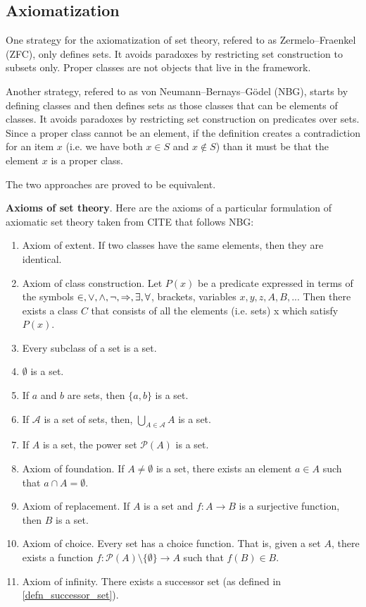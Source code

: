 \documentclass{article}
\begin{document}
\subsection{Axiomatization}

One strategy for the axiomatization of set theory, refered to as Zermelo–Fraenkel (ZFC), only defines sets. It avoids paradoxes by restricting set construction to subsets only. Proper classes are not objects that live in the framework.

Another strategy, refered to as von Neumann–Bernays–Gödel (NBG), starts by defining classes and then defines sets as those classes that can be elements of classes. It avoids paradoxes by restricting set construction on predicates over sets. Since a proper class cannot be an element, if the definition creates a contradiction for an item $x$ (i.e. we have both $x \in S$ and $x \notin S$) than it must be that the element $x$ is a proper class.

The two approaches are proved to be equivalent.

\textbf{Axioms of set theory}. Here are the axioms of a particular formulation of axiomatic set theory taken from CITE that follows NBG:
\begin{enumerate}
	\item Axiom of extent. If two classes have the same elements, then they are identical.
	\item Axiom of class construction. Let $P(x)$ be a predicate expressed in terms of the symbols $\in, \vee, \wedge, \neg, \Rightarrow, \exists, \forall$, brackets, variables $x, y, z, A, B, ...$ Then there exists a class $C$ that consists of all the elements (i.e. sets) x which satisfy $P(x)$.
	\item Every subclass of a set is a set.
	\item $\emptyset$ is a set.
	\item If $a$ and $b$ are sets, then $\{a, b\}$ is a set.
	\item If $\mathcal{A}$ is a set of sets, then, $\bigcup\limits_{A \in \mathcal{A}} A$ is a set.
	\item If $A$ is a set, the power set $\mathcal{P}(A)$ is a set.
	\item Axiom of foundation. If $A \neq \emptyset$ is a set, there exists an element $a \in A$ such that $a \cap A = \emptyset$.
	\item Axiom of replacement. If $A$ is a set and $f : A \to B$ is a surjective function, then $B$ is a set.
	\item Axiom of choice. Every set has a choice function. That is, given a set $A$, there exists a function $f : \mathcal{P}(A) \setminus \{ \emptyset \} \to A$ such that $f(B) \in B$.
	\item Axiom of infinity. There exists a successor set (as defined in \ref{defn_successor_set}).
\end{enumerate}
\end{document}
